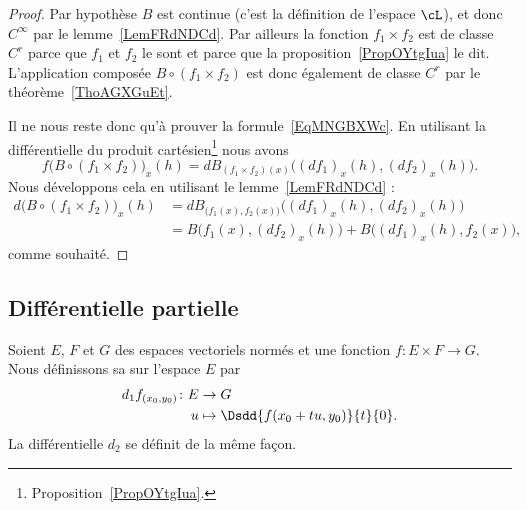 \begin{proof}
	Par hypothèse \( B\) est continue (c'est la définition de l'espace \( \cL\)), et donc \(  C^{\infty}\) par le lemme~\ref{LemFRdNDCd}. Par ailleurs la fonction \( f_1\times f_2\) est de classe \( C^r\) parce que \( f_1\) et \( f_2\) le sont et parce que la proposition~\ref{PropOYtgIua} le dit. L'application composée \( B\circ(f_1\times f_2)\) est donc également de classe \( C^r\) par le théorème~\ref{ThoAGXGuEt}.

	Il ne nous reste donc qu'à prouver la formule~\ref{EqMNGBXWc}. En utilisant la différentielle du produit cartésien\footnote{Proposition~\ref{PropOYtgIua}.} nous avons
	\begin{equation}
		f\big( B\circ(f_1\times f_2) \big)_x(h)=dB_{(f_1\times f_2)(x)}\big( (df_1)_x(h),(df_2)_x(h) \big).
	\end{equation}
	Nous développons cela en utilisant le lemme~\ref{LemFRdNDCd} :
	\begin{subequations}
		\begin{align}
			d\big( B\circ(f_1\times f_2) \big)_x(h) & =dB_{\big( f_1(x),f_2(x) \big)}\big( (df_1)_x(h),(df_2)_x(h) \big) \\
			                                        & =B\big( f_1(x),(df_2)_x(h) \big)+B\big( (df_1)_x(h),f_2(x) \big),
		\end{align}
	\end{subequations}
	comme souhaité.
\end{proof}

\subsection{Différentielle partielle}

\begin{definition}    \label{VJM_CtSKT}
	Soient \( E\), \( F\) et \( G\) des espaces vectoriels normés et une fonction \( f\colon E\times F\to G\). Nous définissons sa  sur l'espace \( E\) par
	\begin{equation}
		\begin{aligned}
			d_1f_{(x_0,y_0)}\colon E & \to G                                  \\
			u                        & \mapsto \Dsdd{ f(x_0+tu,y_0) }{t}{0} .
		\end{aligned}
	\end{equation}
	La différentielle \( d_2\) se définit de la même façon.
\end{definition}

